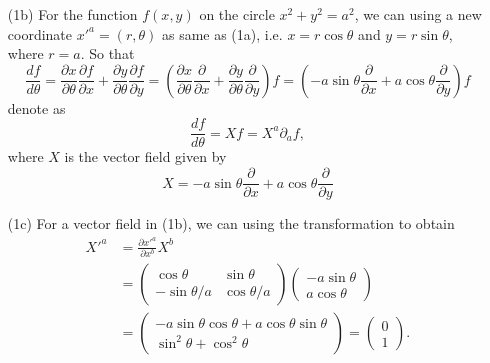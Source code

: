 \documentclass[12pt]{article}%
\begin{document}
\begin{enumerate}
{\begin{minipage}[c]{0.98\linewidth}
\begin{enumerate}
\item[(1b)] For the function $f(x,y)$ on the circle $x^2 + y^2 = a^2$, we can using a new coordinate $x'^{a} = (r,\theta)$ as same as (1a), i.e. $x=r\cos\theta$ and $y=r\sin\theta$, where $r=a$. So that 
\begin{equation}
\frac{df}{d\theta}
= \frac{\partial x}{\partial \theta} \frac{\partial f}{\partial x} + \frac{\partial y}{\partial \theta} \frac{\partial f}{\partial y}
= \left(\frac{\partial x}{\partial \theta} \frac{\partial}{\partial x} + \frac{\partial y}{\partial \theta} \frac{\partial}{\partial y}\right)f
= \left(-a\sin\theta\frac{\partial}{\partial x} + a\cos\theta\frac{\partial}{\partial y}\right)f
\end{equation}
denote as
\begin{equation}
\frac{df}{d\theta} = Xf = X^{a}\partial_{a} f,
\end{equation}
where $X$ is the vector field given by
\begin{equation}
X = -a\sin\theta\frac{\partial}{\partial x} + a\cos\theta\frac{\partial}{\partial y}
\end{equation}



\item[(1c)] For a vector field in (1b), we can using the transformation to obtain
\begin{align}
X'^{a} &= \frac{\partial x'^{a}}{\partial x^{b}}X^{b}\\
&= \begin{pmatrix}
\cos\theta & \sin\theta\\
-\sin\theta/a & \cos\theta/a
\end{pmatrix}
\begin{pmatrix}
-a\sin\theta\\a\cos\theta
\end{pmatrix}\\
&= \begin{pmatrix}
-a\sin\theta\cos\theta + a\cos\theta\sin\theta\\
\sin^2\theta +  \cos^2\theta
\end{pmatrix} = \begin{pmatrix}
0 \\ 1
\end{pmatrix}.
\end{align}



\end{enumerate}
\end{minipage}}












\end{enumerate}

\end{document}

